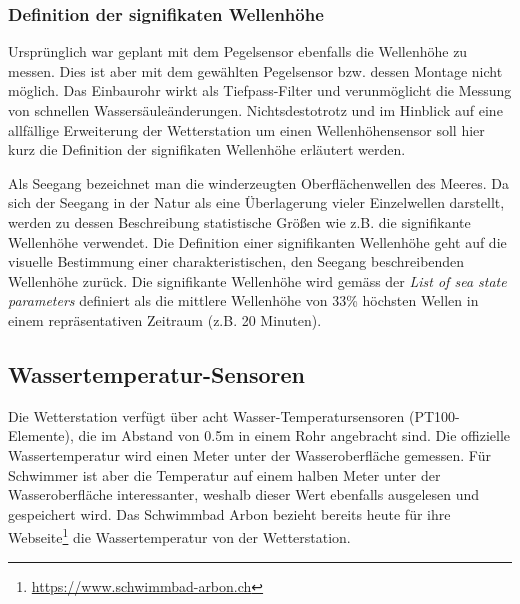 \subsubsection{Definition der signifikaten Wellenhöhe}
Ursprünglich war geplant mit dem Pegelsensor ebenfalls die Wellenhöhe zu messen. Dies ist aber mit dem gewählten Pegelsensor bzw. dessen Montage nicht möglich. Das Einbaurohr wirkt als Tiefpass-Filter und verunmöglicht die Messung von schnellen Wassersäuleänderungen. Nichtsdestotrotz und im Hinblick auf eine allfällige Erweiterung der Wetterstation um einen Wellenhöhensensor soll hier kurz die Definition der signifikaten Wellenhöhe erläutert werden.

Als Seegang bezeichnet man die winderzeugten Oberflächenwellen des Meeres. Da sich der Seegang in der Natur als eine Überlagerung vieler Einzelwellen darstellt, werden zu dessen Beschreibung statistische Größen wie z.B. die signifikante Wellenhöhe verwendet. Die Definition einer signifikanten Wellenhöhe geht auf die visuelle Bestimmung einer charakteristischen, den Seegang beschreibenden Wellenhöhe zurück. Die signifikante Wellenhöhe wird gemäss der \textit{List of sea state parameters}\cite{1986Iahr} definiert als die mittlere Wellenhöhe von 33\% höchsten Wellen in einem repräsentativen Zeitraum (z.B. 20 Minuten).


\subsection{Wassertemperatur-Sensoren}
Die Wetterstation verfügt über acht Wasser-Temperatursensoren (PT100-Elemente), die im Abstand von 0.5m in einem Rohr angebracht sind. Die offizielle Wassertemperatur wird einen Meter unter der Wasseroberfläche gemessen. Für Schwimmer ist aber die Temperatur auf einem halben Meter unter der Wasseroberfläche interessanter, weshalb dieser Wert ebenfalls ausgelesen und gespeichert wird. Das Schwimmbad Arbon bezieht bereits heute für ihre Webseite\footnote{\url{https://www.schwimmbad-arbon.ch}} die Wassertemperatur von der Wetterstation.

